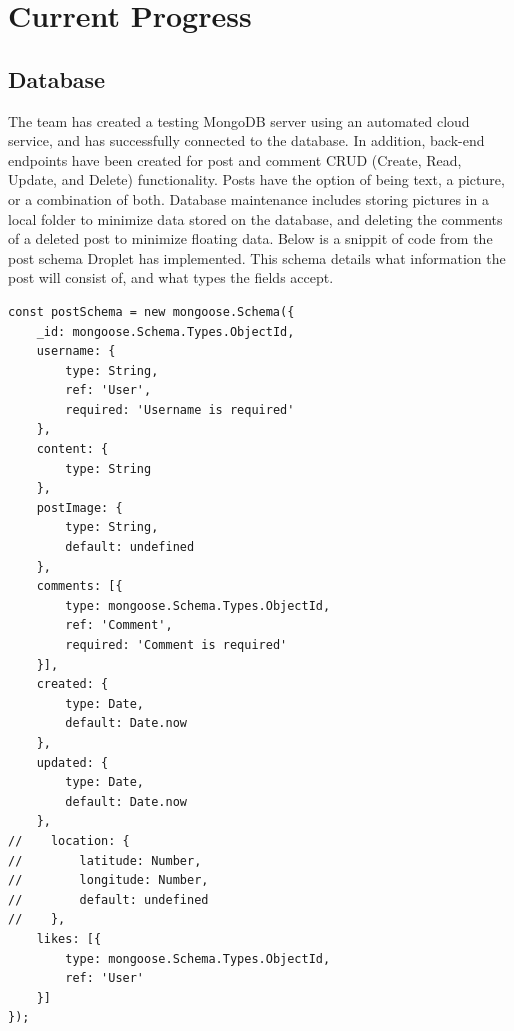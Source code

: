 \documentclass[draftclsnofoot, onecolumn, letterpaper,10pt,compsoc]{IEEEtran}
\begin{document}
\section{Current Progress}
\subsection{Database}
The team has created a testing MongoDB server using an automated cloud service, and has successfully connected to the database.  In addition, back-end endpoints have been created for post and comment CRUD (Create, Read, Update, and Delete) functionality.  Posts have the option of being text, a picture, or a combination of both.  Database maintenance includes storing pictures in a local folder to minimize data stored on the database, and deleting the comments of a deleted post to minimize floating data.  Below is a snippit of code from the post schema Droplet has implemented.  This schema details what information the post will consist of, and what types the fields accept.

\begin{lstlisting}
const postSchema = new mongoose.Schema({
    _id: mongoose.Schema.Types.ObjectId,
    username: {
        type: String,
        ref: 'User',
        required: 'Username is required'
    },
    content: {
        type: String
    },
    postImage: {
        type: String,
        default: undefined
    },
    comments: [{
        type: mongoose.Schema.Types.ObjectId,
        ref: 'Comment',
        required: 'Comment is required'
    }],
    created: {
        type: Date,
        default: Date.now
    },
    updated: {
        type: Date,
        default: Date.now
    },
//    location: {
//        latitude: Number,
//        longitude: Number,
//        default: undefined
//    },
    likes: [{
        type: mongoose.Schema.Types.ObjectId,
        ref: 'User'
    }]
});
\end{lstlisting}
\end{document}
